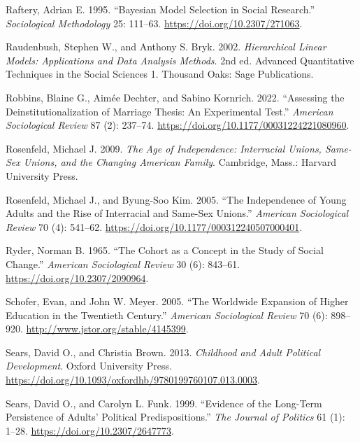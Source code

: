 \documentclass[
  12pt,
]{article}
\newlength{\cslhangindent}
\newlength{\cslentryspacingunit} %
\newenvironment{CSLReferences}[2] %
 {%
  \setlength{\parindent}{0pt}
  \ifodd #1
  \let\oldpar\par
  \def\par{\hangindent=\cslhangindent\oldpar}
  \fi
  \setlength{\parskip}{#2\cslentryspacingunit}
 }%
 {}
\begin{document}
\begin{CSLReferences}{1}{0}
\leavevmode{}%
Raftery, Adrian E. 1995. {``Bayesian {Model} {Selection} in {Social} {Research}.''} \emph{Sociological Methodology} 25: 111--63. \url{https://doi.org/10.2307/271063}.

\leavevmode{}%
Raudenbush, Stephen W., and Anthony S. Bryk. 2002. \emph{Hierarchical Linear Models: Applications and Data Analysis Methods}. 2nd ed. Advanced Quantitative Techniques in the Social Sciences 1. Thousand Oaks: Sage Publications.

\leavevmode{}%
Robbins, Blaine G., Aimée Dechter, and Sabino Kornrich. 2022. {``Assessing the {Deinstitutionalization} of {Marriage} {Thesis}: {An} {Experimental} {Test}.''} \emph{American Sociological Review} 87 (2): 237--74. \url{https://doi.org/10.1177/00031224221080960}.

\leavevmode{}%
Rosenfeld, Michael J. 2009. \emph{The Age of Independence: Interracial Unions, Same-Sex Unions, and the Changing {American} Family}. Cambridge, Mass.: Harvard University Press.

\leavevmode{}%
Rosenfeld, Michael J., and Byung-Soo Kim. 2005. {``The {Independence} of {Young} {Adults} and the {Rise} of {Interracial} and {Same}-{Sex} {Unions}.''} \emph{American Sociological Review} 70 (4): 541--62. \url{https://doi.org/10.1177/000312240507000401}.

\leavevmode{}%
Ryder, Norman B. 1965. {``The {Cohort} as a {Concept} in the {Study} of {Social} {Change}.''} \emph{American Sociological Review} 30 (6): 843--61. \url{https://doi.org/10.2307/2090964}.

\leavevmode{}%
Schofer, Evan, and John W. Meyer. 2005. {``The {Worldwide} {Expansion} of {Higher} {Education} in the {Twentieth} {Century}.''} \emph{American Sociological Review} 70 (6): 898--920. \url{http://www.jstor.org/stable/4145399}.

\leavevmode{}%
Sears, David O., and Christia Brown. 2013. \emph{Childhood and {Adult} {Political} {Development}}. Oxford University Press. \url{https://doi.org/10.1093/oxfordhb/9780199760107.013.0003}.

\leavevmode{}%
Sears, David O., and Carolyn L. Funk. 1999. {``Evidence of the {Long}-{Term} {Persistence} of {Adults}' {Political} {Predispositions}.''} \emph{The Journal of Politics} 61 (1): 1--28. \url{https://doi.org/10.2307/2647773}.


\end{CSLReferences}
\end{document}
